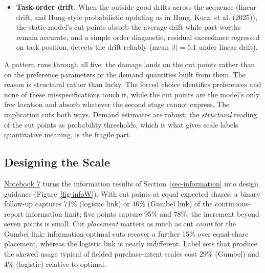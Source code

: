 \documentclass[
  letterpaper,
  DIV=11,
  numbers=noendperiod]{scrartcl}
\newcounter{none} %
\theoremstyle{plain}
\theoremstyle{plain}
\theoremstyle{remark}
\begin{document}
\begin{itemize}
  0.111 under correct specification), and individual part-worth RMSE
  rises only to 0.553 from 0.524. The damage is again absorbed by the
  cut points, and in the direction theory predicts: nesting makes
  \(G(e^{V}) < \sum_j e^{V_j}\), so the fitted model overstates the
  inclusive value and the top-2-box cut compensates upward by 0.21.
\item
  \textbf{Task-order drift.} When the outside good drifts across the
  sequence (linear drift, and Hung-style probabilistic updating as in
  Hung, Kurz, et al. (2025)), the static model's cut points absorb the
  average drift while part-worths remain accurate, and a simple order
  diagnostic, residual exceedance regressed on task position, detects
  the drift reliably (mean \(|t| = 5.1\) under linear drift).
\end{itemize}

A pattern runs through all five: the damage lands on the cut points
rather than on the preference parameters or the demand quantities built
from them. The reason is structural rather than lucky. The forced choice
identifies preferences and none of these misspecifications touch it,
while the cut points are the model's only free location and absorb
whatever the second stage cannot express. The implication cuts both
ways. Demand estimates are robust; the \emph{structural} reading of the
cut points as probability thresholds, which is what gives scale labels
quantitative meaning, is the fragile part.

\subsection{Designing the Scale}\label{sec-sim-design}

\href{notebooks/07-scale-design.qmd}{Notebook 7} turns the information
results of Section~\ref{sec-information} into design guidance
(Figure~\ref{fig-infoW}). With cut points at equal expected shares, a
binary follow-up captures 71\% (logistic link) or 46\% (Gumbel link) of
the continuous-report information limit; five points capture 95\% and
78\%; the increment beyond seven points is small. Cut \emph{placement}
matters as much as cut \emph{count} for the Gumbel link:
information-optimal cuts recover a further 15\% over equal-share
placement, whereas the logistic link is nearly indifferent. Label sets
that produce the skewed usage typical of fielded purchase-intent scales
cost 29\% (Gumbel) and 4\% (logistic) relative to optimal.
\end{document}
